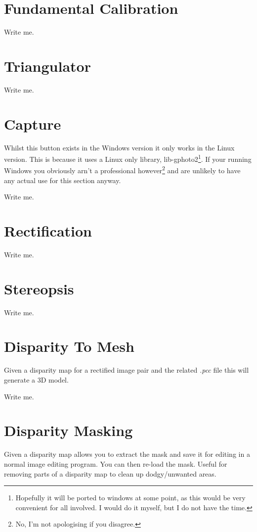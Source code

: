 \documentclass[10pt,a4paper,twoside]{article}
\begin{document}
\section{Fundamental Calibration}
Write me.



\section{Triangulator}
Write me.



\section{Capture}
Whilst this button exists in the Windows version it only works in the Linux version. This is because it uses a Linux only library, lib-gphoto2\footnote{Hopefully it will be ported to windows at some point, as this would be very convenient for all involved. I would do it myself, but I do not have the time.}. If your running Windows you obviously arn't a professional however\footnote{No, I'm not apologising if you disagree.} and are unlikely to have any actual use for this section anyway.

Write me.



\section{Rectification}
Write me.



\section{Stereopsis}
Write me.



\section{Disparity To Mesh}
Given a disparity map for a rectified image pair and the related \emph{.pcc} file this will generate a 3D model.

Write me.



\section{Disparity Masking}
Given a disparity map allows you to extract the mask and save it for editing in a normal image editing program. You can then re-load the mask. Useful for removing parts of a disparity map to clean up dodgy/unwanted areas.
\end{document}
